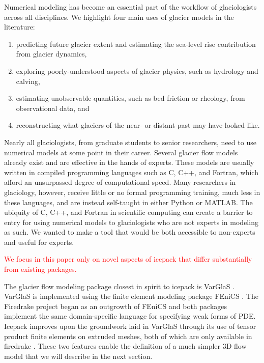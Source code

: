 \documentclass{article}
\theoremstyle{definition}
\theoremstyle{plain}
\begin{document}
Numerical modeling has become an essential part of the workflow of glaciologists across all disciplines.
We highlight four main uses of glacier models in the literature:
\begin{enumerate}
    \item predicting future glacier extent and estimating the sea-level rise contribution from glacier dynamics,
    \item exploring poorly-understood aspects of glacier physics, such as hydrology and calving,
    \item estimating unobservable quantities, such as bed friction or rheology, from observational data, and
    \item reconstructing what glaciers of the near- or distant-past may have looked like.
\end{enumerate}
Nearly all glaciologists, from graduate students to senior researchers, need to use numerical models at some point in their career.
Several glacier flow models already exist and are effective in the hands of experts.
These models are usually written in compiled programming languages such as C, C++, and Fortran, which afford an unsurpassed degree of computational speed.
Many researchers in glaciology, however, receive little or no formal programming training, much less in these languages, and are instead self-taught in either Python or MATLAB.
The ubiquity of C, C++, and Fortran in scientific computing can create a barrier to entry for using numerical models to glaciologists who are not experts in modeling as such.
We wanted to make a tool that would be both accessible to non-experts and useful for experts.

\textcolor{red}{We focus in this paper only on novel aspects of icepack that differ substantially from existing packages.}

The glacier flow modeling package closest in spirit to icepack is VarGlaS \citep{brinkerhoff2013data}.
VarGlaS is implemented using the finite element modeling package FEniCS \citep{logg2012automated}.
The Firedrake project began as an outgrowth of FEniCS and both packages implement the same domain-specific language for specifying weak forms of PDE.
Icepack improves upon the groundwork laid in VarGlaS through its use of tensor product finite elements on extruded meshes, both of which are only available in firedrake \citep{bercea2016structure, mcrae2016automated}.
These two features enable the definition of a much simpler 3D flow model that we will describe in the next section.
\end{document}
